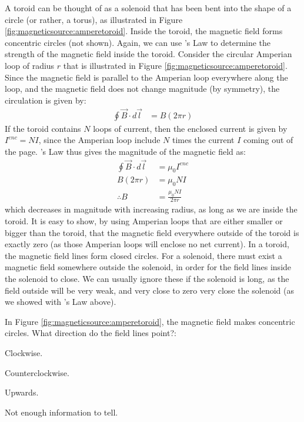 A toroid can be thought of as a solenoid that has been bent into the shape of a circle (or rather, a torus), as illustrated in Figure \ref{fig:magneticsource:amperetoroid}. Inside the toroid, the magnetic field forms concentric circles (not shown). 
Again, we can use \ampere's Law to determine the strength of the magnetic field inside the toroid. Consider the circular Amperian loop of radius $r$ that is illustrated in Figure \ref{fig:magneticsource:amperetoroid}. Since the magnetic field is parallel to the Amperian loop everywhere along the loop, and the magnetic field does not change magnitude (by symmetry), the circulation is given by:
\begin{align*}
\oint \vec B \cdot d\vec l &= B (2\pi r)
\end{align*}
If the toroid contains $N$ loops of current, then the enclosed current is given by $I^{enc}=NI$, since the Amperian loop include $N$ times the current $I$ coming out of the page. \ampere's Law thus gives the magnitude of the magnetic field as:
\begin{align*}
\oint \vec B \cdot d\vec l &=\mu_0 I^{enc}\\
B (2\pi r) &= \mu_0 NI\\
\therefore B&=\frac{\mu_0 NI}{2\pi r}
\end{align*}
which decreases in magnitude with increasing radius, as long as we are inside the toroid. It is easy to show, by using Amperian loops that are either smaller or bigger than the toroid, that the magnetic field everywhere outside of the toroid is exactly zero (as those Amperian loops will enclose no net current). In a toroid, the magnetic field lines form closed circles. For a solenoid, there must exist a magnetic field somewhere outside the solenoid, in order for the field lines inside the solenoid to close. We can usually ignore these if the solenoid is long, as the field outside will be very weak, and very close to zero very close the solenoid (as we showed with \ampere's Law above). 

\begin{checkpoint}{}
	\begin{MCquestion}{In Figure \ref{fig:magneticsource:amperetoroid}, the magnetic field makes concentric circles. What direction do the field lines point?:}
		\item Clockwise.
		\item Counterclockwise. \correct
		\item Upwards.
		\item Not enough information to tell.
	\end{MCquestion}
\end{checkpoint}

